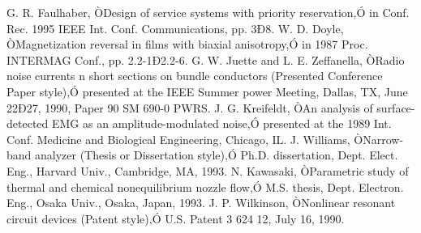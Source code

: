 \documentclass[a4paper, 10pt, conference]{ieeeconf}      %
\begin{document}
\begin{thebibliography}{99}
		 G. R. Faulhaber, ÒDesign of service systems with priority reservation,Ó in Conf. Rec. 1995 IEEE Int. Conf. Communications, pp. 3Ð8.
		 W. D. Doyle, ÒMagnetization reversal in films with biaxial anisotropy,Ó in 1987 Proc. INTERMAG Conf., pp. 2.2-1Ð2.2-6.
		 G. W. Juette and L. E. Zeffanella, ÒRadio noise currents n short sections on bundle conductors (Presented Conference Paper style),Ó presented at the IEEE Summer power Meeting, Dallas, TX, June 22Ð27, 1990, Paper 90 SM 690-0 PWRS.
		 J. G. Kreifeldt, ÒAn analysis of surface-detected EMG as an amplitude-modulated noise,Ó presented at the 1989 Int. Conf. Medicine and Biological Engineering, Chicago, IL.
		 J. Williams, ÒNarrow-band analyzer (Thesis or Dissertation style),Ó Ph.D. dissertation, Dept. Elect. Eng., Harvard Univ., Cambridge, MA, 1993. 
		 N. Kawasaki, ÒParametric study of thermal and chemical nonequilibrium nozzle flow,Ó M.S. thesis, Dept. Electron. Eng., Osaka Univ., Osaka, Japan, 1993.
		 J. P. Wilkinson, ÒNonlinear resonant circuit devices (Patent style),Ó U.S. Patent 3 624 12, July 16, 1990. 
		
		
		
		
		
		
	\end{thebibliography}
	
	
	
	
\end{document}
